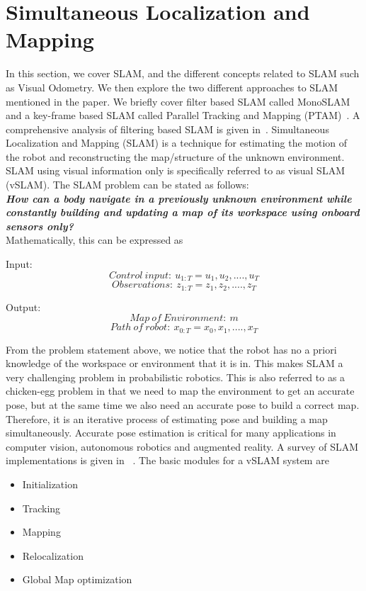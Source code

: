 \section{Simultaneous Localization and Mapping}
\label{slam}

In this section, we cover SLAM, and the different concepts related to SLAM such as Visual Odometry. We then explore the two different approaches to SLAM mentioned in the paper. We briefly cover filter based SLAM called MonoSLAM~\cite{davison2007monoslam} and a key-frame based SLAM called Parallel Tracking and Mapping (PTAM)~\cite{klein2007parallel}. A comprehensive analysis of filtering based SLAM is given in~\cite{strasdatavisual}. Simultaneous Localization and Mapping (SLAM) is a technique for estimating the motion of the robot and reconstructing the map/structure of the unknown environment. SLAM using visual information only is specifically referred to as visual SLAM (vSLAM). The SLAM problem can be stated as follows:\\

\textbf{\emph{How can a body navigate in a previously unknown environment while constantly building and updating a map of its workspace using onboard sensors only?} ~\cite{chli2017}}\\

Mathematically, this can be expressed as~\cite{cyrillslam}

Input:\
\begin{equation}
Control\ input:\ u_{1:T} = {u_1, u_2, ...., u_T}
\end{equation}
\begin{equation}
Observations:\ z_{1:T} = {z_1, z_2, ...., z_T}
\end{equation}

Output:\
\begin{equation}
Map\ of\ Environment:\ m
\end{equation}
\begin{equation}
Path\ of\ robot:\ x_{0:T} = {x_0, x_1, ...., x_T}
\end{equation}

From the problem statement above, we notice that the robot has no a priori knowledge of the workspace or environment that it is in. This makes SLAM a very challenging problem in probabilistic robotics. This is also referred to as a chicken-egg problem in that we need to map the environment to get an accurate pose, but at the same time we also need an accurate pose to build a correct map. Therefore, it is an iterative process of estimating pose and building a map simultaneously. Accurate pose estimation is critical for many applications in computer vision, autonomous robotics and augmented reality. A survey of SLAM implementations is given in ~\cite{bresson2017simultaneous,cadena2016past,taketomi2017visual}. The basic modules for a vSLAM system are
\begin{itemize}
\item Initialization
\item Tracking
\item Mapping
\item Relocalization
\item Global Map optimization
\end{itemize}

